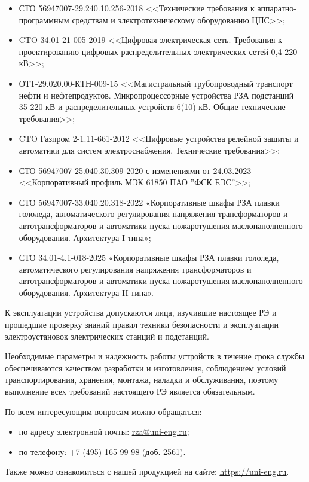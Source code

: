 \begin{itemize}
\item СТО 56947007-29.240.10.256-2018 <<Технические требования к аппаратно-программным средствам и электротехническому оборудованию ЦПС>>;
\item CTO 34.01-21-005-2019 <<Цифровая электрическая сеть. Требования к проектированию цифровых распределительных электрических сетей 0,4-220 кВ>>;
\item \sloppy ОТТ-29.020.00-КТН-009-15 <<Магистральный трубопроводный транспорт нефти и нефтепродуктов. Микропроцессорные устройства РЗА подстанций 35-220 кВ и распределительных устройств 6(10) кВ. Общие технические требования>>;
\item CTO Газпром 2-1.11-661-2012 <<Цифровые устройства релейной защиты и автоматики для систем электроснабжения. Технические требования>>;
\item СТО 56947007-25.040.30.309-2020 с изменениями от 24.03.2023 <<Корпоративный профиль МЭК 61850 ПАО ''ФСК ЕЭС''>>;
\item СТО 56947007-33.040.20.318-2022 «Корпоративные шкафы РЗА плавки гололеда, 
автоматического регулирования напряжения трансформаторов и автотрансформаторов и 
автоматики пуска пожаротушения маслонаполненного оборудования. Архитектура I типа»;
\item СТО 34.01-4.1-018-2025 «Корпоративные шкафы РЗА плавки гололеда, автоматического 
регулирования напряжения трансформаторов и автотрансформаторов и автоматики пуска 
пожаротушения маслонаполненного оборудования. Архитектура II типа».

\end{itemize}

\par
К эксплуатации устройства допускаются лица, изучившие настоящее РЭ и прошедшие проверку знаний правил техники безопасности и эксплуатации электроустановок электрических станций и подстанций.

\par
Необходимые параметры и надежность работы устройств в течение срока службы обеспечиваются качеством разработки и изготовления, соблюдением условий транспортирования, хранения, монтажа, наладки и обслуживания, поэтому выполнение всех требований настоящего РЭ является обязательным.
\par
По всем интересующим вопросам можно обращаться:
\begin{itemize}
\item по адресу электронной почты: \href{mailto:rza@uni-eng.ru}{\color{uniblue}\uline{rza@uni-eng.ru}};
\item по телефону: +7 (495) 165-99-98 (доб. 2561).
\end{itemize}
Также можно ознакомиться с нашей продукцией на сайте: \href{https://uni-eng.ru}{\color{uniblue}\uline{https://uni-eng.ru}}.

